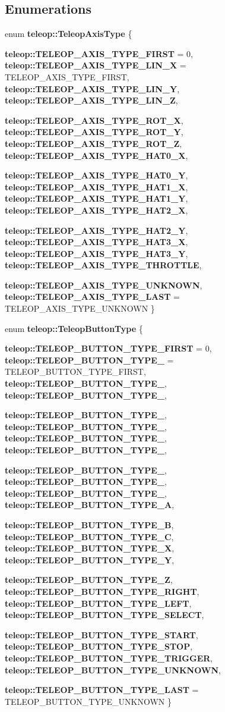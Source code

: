 \subsection*{Enumerations}
\begin{DoxyCompactItemize}
\item 
enum {\bf teleop::TeleopAxisType} \{ \par
{\bf teleop::TELEOP\_\-AXIS\_\-TYPE\_\-FIRST} =  0, 
{\bf teleop::TELEOP\_\-AXIS\_\-TYPE\_\-LIN\_\-X} =  TELEOP\_\-AXIS\_\-TYPE\_\-FIRST, 
{\bf teleop::TELEOP\_\-AXIS\_\-TYPE\_\-LIN\_\-Y}, 
{\bf teleop::TELEOP\_\-AXIS\_\-TYPE\_\-LIN\_\-Z}, 
\par
{\bf teleop::TELEOP\_\-AXIS\_\-TYPE\_\-ROT\_\-X}, 
{\bf teleop::TELEOP\_\-AXIS\_\-TYPE\_\-ROT\_\-Y}, 
{\bf teleop::TELEOP\_\-AXIS\_\-TYPE\_\-ROT\_\-Z}, 
{\bf teleop::TELEOP\_\-AXIS\_\-TYPE\_\-HAT0\_\-X}, 
\par
{\bf teleop::TELEOP\_\-AXIS\_\-TYPE\_\-HAT0\_\-Y}, 
{\bf teleop::TELEOP\_\-AXIS\_\-TYPE\_\-HAT1\_\-X}, 
{\bf teleop::TELEOP\_\-AXIS\_\-TYPE\_\-HAT1\_\-Y}, 
{\bf teleop::TELEOP\_\-AXIS\_\-TYPE\_\-HAT2\_\-X}, 
\par
{\bf teleop::TELEOP\_\-AXIS\_\-TYPE\_\-HAT2\_\-Y}, 
{\bf teleop::TELEOP\_\-AXIS\_\-TYPE\_\-HAT3\_\-X}, 
{\bf teleop::TELEOP\_\-AXIS\_\-TYPE\_\-HAT3\_\-Y}, 
{\bf teleop::TELEOP\_\-AXIS\_\-TYPE\_\-THROTTLE}, 
\par
{\bf teleop::TELEOP\_\-AXIS\_\-TYPE\_\-UNKNOWN}, 
{\bf teleop::TELEOP\_\-AXIS\_\-TYPE\_\-LAST} =  TELEOP\_\-AXIS\_\-TYPE\_\-UNKNOWN
 \}
\item 
enum {\bf teleop::TeleopButtonType} \{ \par
{\bf teleop::TELEOP\_\-BUTTON\_\-TYPE\_\-FIRST} =  0, 
{\bf teleop::TELEOP\_\-BUTTON\_\-TYPE\_} =  TELEOP\_\-BUTTON\_\-TYPE\_\-FIRST, 
{\bf teleop::TELEOP\_\-BUTTON\_\-TYPE\_}, 
{\bf teleop::TELEOP\_\-BUTTON\_\-TYPE\_}, 
\par
{\bf teleop::TELEOP\_\-BUTTON\_\-TYPE\_}, 
{\bf teleop::TELEOP\_\-BUTTON\_\-TYPE\_}, 
{\bf teleop::TELEOP\_\-BUTTON\_\-TYPE\_}, 
{\bf teleop::TELEOP\_\-BUTTON\_\-TYPE\_}, 
\par
{\bf teleop::TELEOP\_\-BUTTON\_\-TYPE\_}, 
{\bf teleop::TELEOP\_\-BUTTON\_\-TYPE\_}, 
{\bf teleop::TELEOP\_\-BUTTON\_\-TYPE\_}, 
{\bf teleop::TELEOP\_\-BUTTON\_\-TYPE\_\-A}, 
\par
{\bf teleop::TELEOP\_\-BUTTON\_\-TYPE\_\-B}, 
{\bf teleop::TELEOP\_\-BUTTON\_\-TYPE\_\-C}, 
{\bf teleop::TELEOP\_\-BUTTON\_\-TYPE\_\-X}, 
{\bf teleop::TELEOP\_\-BUTTON\_\-TYPE\_\-Y}, 
\par
{\bf teleop::TELEOP\_\-BUTTON\_\-TYPE\_\-Z}, 
{\bf teleop::TELEOP\_\-BUTTON\_\-TYPE\_\-RIGHT}, 
{\bf teleop::TELEOP\_\-BUTTON\_\-TYPE\_\-LEFT}, 
{\bf teleop::TELEOP\_\-BUTTON\_\-TYPE\_\-SELECT}, 
\par
{\bf teleop::TELEOP\_\-BUTTON\_\-TYPE\_\-START}, 
{\bf teleop::TELEOP\_\-BUTTON\_\-TYPE\_\-STOP}, 
{\bf teleop::TELEOP\_\-BUTTON\_\-TYPE\_\-TRIGGER}, 
{\bf teleop::TELEOP\_\-BUTTON\_\-TYPE\_\-UNKNOWN}, 
\par
{\bf teleop::TELEOP\_\-BUTTON\_\-TYPE\_\-LAST} =  TELEOP\_\-BUTTON\_\-TYPE\_\-UNKNOWN
 \}
\end{DoxyCompactItemize}

